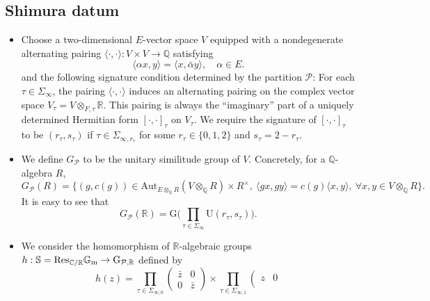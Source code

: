 \documentclass{article}
\begin{document}
\subsection{Shimura datum}


\begin{itemize}
	\item Choose a two-dimensional $E$-vector space $V$ equipped with a nondegenerate alternating pairing $\langle\cdot,\cdot\rangle:V\times V\longrightarrow \mathbb{Q}$ satisfying
		\begin{equation}
				\langle \alpha x,y\rangle=\langle x,\bar\alpha y\rangle,\quad \alpha\in E.
		\end{equation}
and the following signature condition determined by the partition $\mathcal{P}$: For each $\tau\in \Sigma_{\infty}$, the pairing $\langle\cdot,\cdot\rangle$ induces an alternating pairing on the complex vector space $V_\tau=V\otimes_{F,\tau}\mathbb{R}$. This pairing is always the ``imaginary'' part of a uniquely determined Hermitian form $[\cdot,\cdot]_\tau$ on $V_\tau$. We require the signature of $[\cdot,\cdot]_\tau$ to be $(r_\tau,s_\tau)$ if $\tau\in\Sigma_{\infty,r_\tau}$ for some $r_\tau\in\{0,1,2\}$ and $s_\tau=2-r_\tau$.
	\item We define $G_\mathcal{P}$ to be the unitary similitude group of $V$. Concretely, for a $\mathbb{Q}$-algebra $R$,
		\begin{equation}
			G_{\mathcal{P}}(R)=\{(g,c(g))\in \mathrm{Aut}_{E\otimes_\mathbb{Q}R}(V\otimes_{\mathbb{Q}}R)\times R^\times,\  \langle gx,gy \rangle =c(g)\langle x,y\rangle,\  \forall x,y\in V\otimes_{\mathbb{Q}}R \}.
		\end{equation}
It is easy to see that
			\begin{equation}
				G_{\mathcal{P}}(\mathbb{R})=\mathrm{G}\bigg(\prod_{\tau\in \Sigma_\infty} \mathrm{U}(r_\tau,s_\tau)\bigg).
			\end{equation}
	\item We consider the homomorphism of $\mathbb{R}$-algebraic groups $h:\mathbb{S}=\rm{Res}_{\mathbb{C}/\mathbb{R}}\mathbb{G}_m\to G_{\mathcal{P},\mathbb{R}}$ defined by
			\begin{equation}
				h(z)=\prod_{\tau\in \Sigma_{\infty,0}} 
\left(\begin{matrix}
\bar{z} & 0\\
0 &\bar{z}
\end{matrix}\right)
\times \prod_{\tau\in \Sigma_{\infty,1}} 
\left(\begin{matrix}
z & 0\\

\end{matrix}
\end{equation}
\end{itemize}
\end{document}
